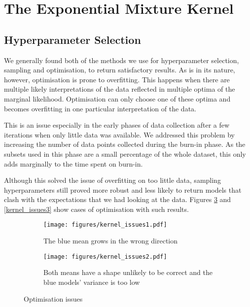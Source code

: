 \documentclass[a4paper,12pt,twoside,openright]{report}
\begin{document}
\section{The Exponential Mixture Kernel}

\subsection{Hyperparameter Selection}

We generally found both of the methods we use for hyperparameter selection, sampling and optimisation, to return satisfactory results. As is in its nature, however, optimisation is prone to overfitting. This happens when there are multiple likely interpretations of the data reflected in multiple optima of the marginal likelihood. Optimisation can only choose one of these optima and becomes overfitting in one particular interpretation of the data.

This is an issue especially in the early phases of data collection after a few iterations when only little data was available. We addressed this problem by increasing the number of data points collected during the burn-in phase. As the subsets used in this phase are a small percentage of the whole dataset, this only adds marginally to the time spent on burn-in.

Although this solved the issue of overfitting on too little data, sampling hyperparameters still proved more robust and less likely to return models that clash with the expectations that we had looking at the data. Figures \ref{kernel_issues_big1} and \ref{kernel_issues3} show cases of optimisation with such results.

\begin{figure}
\centering
\begin{subfigure}{.45\textwidth}
  \centering
  \texttt{[image: figures/kernel\_issues1.pdf]}
\caption{The blue mean grows in the wrong direction}
  \label{kernel_issues1}
\end{subfigure}%
\begin{subfigure}{.45\textwidth}
  \centering
  \texttt{[image: figures/kernel\_issues2.pdf]}
  \caption{Both means have a shape unlikely to be correct and the blue models' variance is too low}
  \label{kernel_issues2}
\end{subfigure}
\caption{Optimisation issues}
\label{kernel_issues_big1}
\end{figure}
\end{document}
